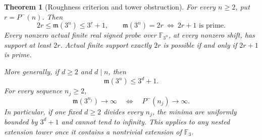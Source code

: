 \documentclass[11pt]{article}
\newtheorem{theorem}{Theorem}[section]
\begin{document}
\begin{theorem}[Roughness criterion and tower obstruction]
\label{thm:odd-pell-extension-roughness}
For every \(n\ge2\), put \(r=P^-(n)\). Then
\[
       2r\le\mathfrak m(3^n)\le3^r+1,
 \qquad
       \mathfrak m(3^n)=2r
          \ \Longleftrightarrow\ 2r+1\text{ is prime}.
\]
Every nonzero actual finite real signed probe over
\(\mathbb F_{3^n}\), at every nonzero shift, has support
at least \(2r\). Actual finite support exactly \(2r\)
is possible if and only if \(2r+1\) is prime.

More generally, if \(d\ge2\) and \(d\mid n\), then
\[
                         \mathfrak m(3^n)\le3^d+1.
\]
For every sequence \(n_j\ge2\),
\[
 \mathfrak m(3^{n_j})\longrightarrow\infty
       \quad\Longleftrightarrow\quad
                  P^-(n_j)\longrightarrow\infty.
\]
In particular, if one fixed \(d\ge2\) divides every \(n_j\),
the minima are uniformly bounded by \(3^d+1\) and cannot
tend to infinity. This applies to any nested extension
tower once it contains a nontrivial extension of
\(\mathbb F_3\).
\end{theorem}
\end{document}
